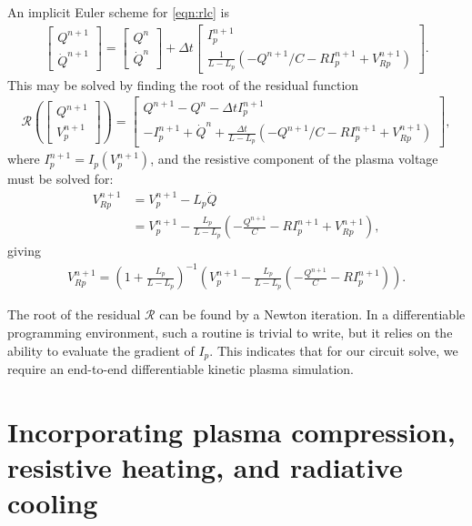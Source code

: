 \documentclass{article}
\begin{document}
An implicit Euler scheme for \eqref{eqn:rlc} is
\begin{align}
    \label{eqn:implicit_euler}
\begin{bmatrix}
    Q^{n+1} \\ \dot{Q}^{n+1}
\end{bmatrix}
=
\begin{bmatrix}
    Q^{n} \\ \dot{Q}^{n}
\end{bmatrix}
+
\Delta t
\begin{bmatrix}
    I_p^{n+1} \\
    \frac{1}{L - L_p} \left( -Q^{n+1} / C - R I_p^{n+1} + V_{Rp}^{n+1} \right) 
\end{bmatrix}.
\end{align}
This may be solved by finding the root of the residual function
\begin{align*}
\mathcal{R} \left( \begin{bmatrix}
        Q^{n+1} \\ V_p^{n+1}
\end{bmatrix} \right) 
=
\begin{bmatrix}
    Q^{n+1} - Q^n - \Delta t I_p^{n+1} \\
    -I_p^{n+1} + \dot{Q}^n + \frac{\Delta t}{L - L_p} \left( -Q^{n+1}/C - R I_p^{n+1} + V_{Rp}^{n+1} \right) 
\end{bmatrix},
\end{align*}
where $I_p^{n+1} = I_p(V_p^{n+1})$, and the resistive component of the plasma voltage must be solved for:
\begin{align*}
    V_{Rp}^{n+1} &= V_p^{n+1} - L_p \ddot{Q} \\
                 &= V_p^{n+1} - \frac{L_p}{L - L_p} \left( -\frac{Q^{n+1}}{C} - R I_p^{n+1} + V_{Rp}^{n+1} \right),
\end{align*}
giving
\begin{align*}
    V_{Rp}^{n+1} = \left( 1 + \frac{L_p}{L - L_p} \right)^{-1} \left( V_p^{n+1} - \frac{L_p}{L - L_p} \left( -\frac{Q^{n+1}}{C} - R I_p^{n+1} \right) \right).
\end{align*}

The root of the residual $\mathcal{R}$ can be found by a Newton iteration.
In a differentiable programming environment, such a routine is trivial to write,
but it relies on the ability to evaluate the gradient of $I_p$.
This indicates that for our circuit solve, we require an end-to-end differentiable 
kinetic plasma simulation.


\section{Incorporating plasma compression, resistive heating, and radiative cooling}
\end{document}
